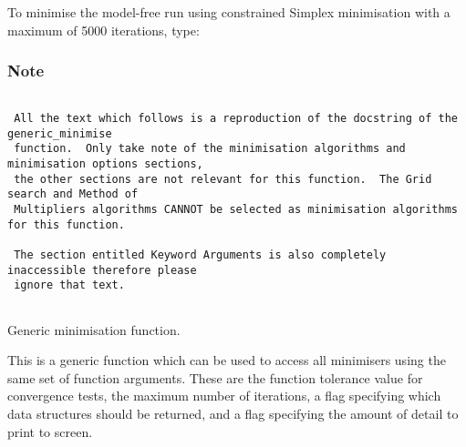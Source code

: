 









 To minimise the model-free run  using constrained Simplex minimisation with a maximum of 5000 iterations, type: 
  


  
 \subsubsection{Note} 

 {\footnotesize \begin{verbatim} 
  
 All the text which follows is a reproduction of the docstring of the generic_minimise 
 function.  Only take note of the minimisation algorithms and minimisation options sections, 
 the other sections are not relevant for this function.  The Grid search and Method of 
 Multipliers algorithms CANNOT be selected as minimisation algorithms for this function. 
  
 The section entitled Keyword Arguments is also completely inaccessible therefore please 
 ignore that text. 
  
 \end{verbatim}} 

 Generic minimisation function. 
  

 This is a generic function which can be used to access all minimisers using the same set of function arguments.  These are the function tolerance value for convergence tests, the maximum number of iterations, a flag specifying which data structures should be returned, and a flag specifying the amount of detail to print to screen. 
  

